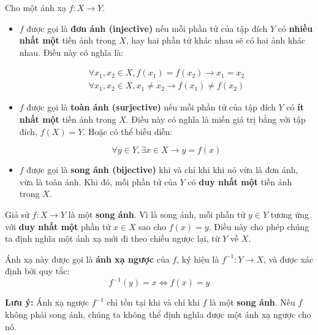 \begin{definition}
    Cho một ánh xạ $f: X \to Y$.
    \begin{itemize}
        \item $f$ được gọi là \textbf{đơn ánh (injective)} nếu mỗi phần tử của tập đích $Y$ có \textbf{nhiều nhất một} tiền ảnh trong $X$, hay hai phần tử khác nhau sẽ có hai ảnh khác nhau. Điều này có nghĩa là:

        \begin{align*}
            \forall x_1, x_2 \in X, f(x_1) = f(x_2) \rightarrow x_1 = x_2 \\
            \forall x_1, x_2 \in X, x_1 \neq x_2 \rightarrow f(x_1) \neq f(x_2)
        \end{align*}
        
        \item $f$ được gọi là \textbf{toàn ánh (surjective)} nếu mỗi phần tử của tập đích $Y$ có \textbf{ít nhất một} tiền ảnh trong $X$. Điều này có nghĩa là miền giá trị bằng với tập đích, $f(X) = Y$. Hoặc có thể biễu diễn:

        \[\forall y \in Y, \exists x \in X \rightarrow y = f(x)\]
        
        \item $f$ được gọi là \textbf{song ánh (bijective)} khi và chỉ khi khi nó vừa là đơn ánh, vừa là toàn ánh. Khi đó, mỗi phần tử của $Y$ có \textbf{duy nhất một} tiền ảnh trong $X$.
    \end{itemize}
\end{definition}



\begin{definition}
    Giả sử $f: X \to Y$ là một \textbf{song ánh}. Vì là song ánh, mỗi phần tử $y \in Y$ tương ứng với \textbf{duy nhất một} phần tử $x \in X$ sao cho $f(x) = y$. Điều này cho phép chúng ta định nghĩa một ánh xạ mới đi theo chiều ngược lại, từ $Y$ về $X$.
    
    Ánh xạ này được gọi là \textbf{ánh xạ ngược} của $f$, ký hiệu là $f^{-1}: Y \to X$, và được xác định bởi quy tắc:
    \[ f^{-1}(y) = x \iff f(x) = y \]
    
    \textbf{Lưu ý:} Ánh xạ ngược $f^{-1}$ chỉ tồn tại khi và chỉ khi $f$ là một \textbf{song ánh}. Nếu $f$ không phải song ánh, chúng ta không thể định nghĩa được một ánh xạ ngược cho nó.
\end{definition}

